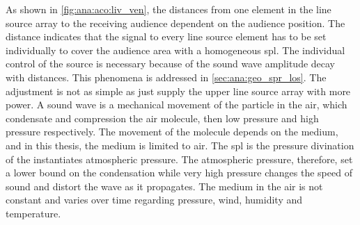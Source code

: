 
As shown in \autoref{fig:ana:aco:liv_ven}, the distances from one element in the line source array to the receiving audience dependent on the audience position. The distance indicates that the signal to every line source element has to be set individually to cover the audience area with a homogeneous \gls{spl}. The individual control of the source is necessary because of the sound wave amplitude decay with distances. This phenomena is addressed in \autoref{sec:ana:geo_spr_los}. The adjustment is not as simple as just supply the upper line source array with more power. A sound wave is a mechanical movement of the particle in the air, which condensate and compression the air molecule, then low pressure and high pressure respectively. The movement of the molecule depends on the medium, and in this thesis, the medium is limited to air. The \gls{spl} is the pressure divination of the instantiates atmospheric pressure. The atmospheric pressure, therefore, set a lower bound on the condensation while very high pressure changes the speed of sound and distort the wave as it propagates.  The medium in the air is not constant and varies over time regarding pressure, wind, humidity and temperature. 


